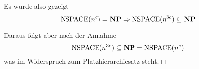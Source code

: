 Es wurde also gezeigt
\begin{equation*}
	\operatorname{NSPACE}(n^c)=\textbf{NP}\Rightarrow\operatorname{NSPACE}(n^{3c})\subseteq\textbf{NP}
\end{equation*}

Daraus folgt aber nach der Annahme
\begin{equation*}
	\operatorname{NSPACE}(n^{3c})\subseteq\textbf{NP} =\operatorname{NSPACE}(n^c)
\end{equation*}
was im Widerspruch zum Platzhierarchiesatz steht.\hfill$\Box$
